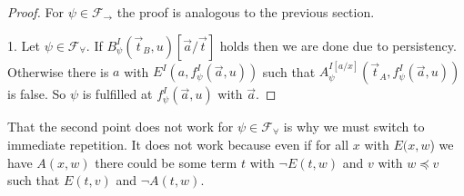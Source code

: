 \documentclass[a4paper,12pt]{report}
\theoremstyle{definition}
\theoremstyle{definition}
\theoremstyle{definition}
\theoremstyle{definition}
\theoremstyle{definition}
\theoremstyle{definition}
\theoremstyle{definition}
\begin{document}
	\begin{proof}
		For $\psi\in\mathcal F_\to$ the proof is analogous to the previous section.
		
		1. Let $\psi\in\mathcal F_\forall$. If $B^I_\psi(\vec t_B, u)[\vec a/\vec t]$ holds then we are done due to persistency. Otherwise there is $a$ with $E^I(a, f^I_\psi(\vec a, u))$ such that $A^{I[a/x]}_\psi(\vec t_A, f^I_\psi(\vec a, u))$ is false. So $\psi$ is fulfilled at $f^I_\psi(\vec a, u)$ with $\vec a$.
	\end{proof}
	
	That the second point does not work for $\psi\in\mathcal F_\forall$ is why we must switch to immediate repetition. It does not work because even if for all $x$ with $E(x, w$) we have $A(x, w)$  there could be some term $t$ with $\neg E(t, w)$ and $v$ with $w\preceq v$ such that $E(t, v)$ and $\neg A(t, w)$.
	
\end{document}
